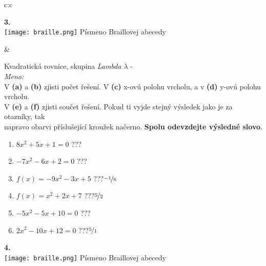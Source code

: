 \documentclass[10pt]{report}
\begin{document}
\begin{tabular}{c:c}
\begin{minipage}[c][99mm][t]{0.49\linewidth}
\begin{center}
\begin{minipage}{0.20\linewidth}
\begin{center}
{\Huge\bfseries 3.} \\[2mm]
\texttt{[image: braille.png]}
{\small Písmeno Braillovej abecedy}
\end{center}
\end{minipage}
\end{center}
\end{minipage}
&
\begin{minipage}[c][99mm][t]{0.49\linewidth}
\begin{center}
\vspace{7mm}
{\huge Kvadratická rovnice, skupina \textit{Lambda $\lambda$} -}\\[4.5mm]
\textit{Meno:}\phantom{xxxxxxxxxxxxxxxxxxxxxxxxxxxxxxxxxxxxxxxxxxxxxxxxxxxxxxxxxxxxxxxxx}\\[3.5mm]
V \textbf{(a)} a \textbf{(b)} zjisti počet řešení. V \textbf{(c)} x-ovú polohu vrcholu, a v \textbf{(d)} y-ovú polohu vrcholu.\\V \textbf{(e)} a \textbf{(f)} zjisti součet řešení. Pokud ti vyjde stejný výsledek jako je za otazníky, tak\\napravo obarvi příslušející kroužek načerno. \textbf{Spolu odevzdejte výsledné slovo}.\\[3mm]
\begin{minipage}{0.77\linewidth}
\begin{center}
\begin{varwidth}{\textwidth}
\begin{enumerate}
\large
\item $8x^2+5x+1=0$\quad \dotfill\; ???\;\dotfill {}
\item $-7x^2-6x+2=0$\quad \dotfill\; ???\;\dotfill {}
\item $f(x)=-9x^2-3x+5$\quad \dotfill\; ???\;\dotfill \quad $\nicefrac{-1}{6}$
\item $f(x)=x^2+2x+7$\quad \dotfill\; ???\;\dotfill \quad $\nicefrac{5}{2}$
\item $-5x^2-5x+10=0$\quad \dotfill\; ???\;\dotfill {}
\item $2x^2-10x+12=0$\quad \dotfill\; ???\;\dotfill \quad $\nicefrac{5}{1}$
\end{enumerate}
\end{varwidth}
\end{center}
\end{minipage}
\begin{minipage}{0.20\linewidth}
\begin{center}
{\Huge\bfseries 4.} \\[2mm]
\texttt{[image: braille.png]}
{\small Písmeno Braillovej abecedy}
\end{center}
\end{minipage}
\end{center}
\end{minipage}

\end{tabular}
\end{document}
